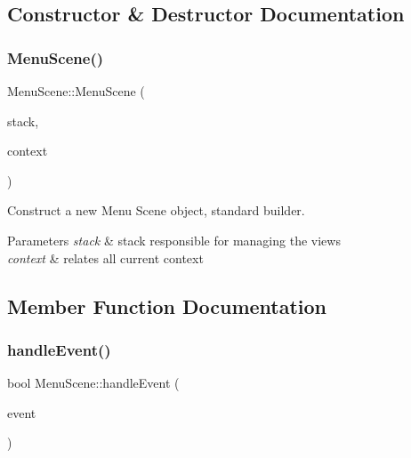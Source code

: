 \subsection{Constructor \& Destructor Documentation}
\mbox{\label{classMenuScene_ad5964f15d3a3f9daa3ab89c8cb4eb3b6}} 
\subsubsection{\texorpdfstring{Menu\+Scene()}{MenuScene()}}
{\footnotesize\ttfamily Menu\+Scene\+::\+Menu\+Scene (\begin{DoxyParamCaption}\item[{\hyperlink{classStateManager}{State\+Manager} \&}]{stack,  }\item[{\hyperlink{structState_1_1Context}{Context}}]{context }\end{DoxyParamCaption})}



Construct a new Menu Scene object, standard builder. 


\begin{DoxyParams}{Parameters}
{\em stack} & stack responsible for managing the views \\
\hline
{\em context} & relates all current context \\
\hline
\end{DoxyParams}


\subsection{Member Function Documentation}
\mbox{\label{classMenuScene_a47f06ae8b2a4830a0a6d104db52fd624}} 
\subsubsection{\texorpdfstring{handle\+Event()}{handleEvent()}}
{\footnotesize\ttfamily bool Menu\+Scene\+::handle\+Event (\begin{DoxyParamCaption}\item[{const sf\+::\+Event \&}]{event }\end{DoxyParamCaption})\hspace{0.3cm}{\ttfamily [virtual]}}



